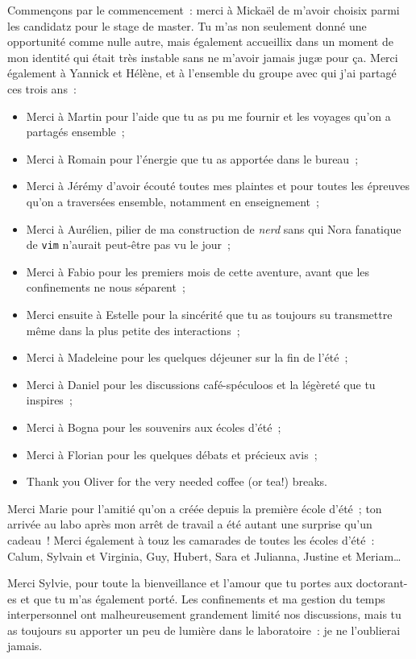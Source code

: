 \documentclass[../main/main.tex]{subfiles}
\begin{document}
Commençons par le commencement~: merci à Mickaël de m'avoir choisix parmi les
candidatz pour le stage de master. Tu m'as non seulement donné une opportunité
comme nulle autre, mais également accueillix dans un moment de mon identité qui
était très instable sans ne m'avoir jamais jugæ pour ça. Merci également à
Yannick et Hélène, et à l'ensemble du groupe avec qui j'ai partagé ces trois
ans~:
\begin{itemize}
    \item Merci à Martin pour l'aide que tu as pu me fournir et les voyages
        qu'on a partagés ensemble~;
    \item Merci à Romain pour l'énergie que tu as apportée dans le bureau~;
    \item Merci à Jérémy d'avoir écouté toutes mes plaintes et pour toutes les
        épreuves qu'on a traversées ensemble, notamment en enseignement~;
    \item Merci à Aurélien, pilier de ma construction de \textit{nerd} sans qui
      Nora fanatique de \texttt{vim} n'aurait peut-être pas vu le jour~;
    \item Merci à Fabio pour les premiers mois de cette aventure, avant que les
        confinements ne nous séparent~;
    \item Merci ensuite à Estelle pour la sincérité que tu as toujours su
        transmettre même dans la plus petite des interactions~;
    \item Merci à Madeleine pour les quelques déjeuner sur la fin de l'été~;
    \item Merci à Daniel pour les discussions café-spéculoos et la légèreté que
        tu inspires~;
    \item Merci à Bogna pour les souvenirs aux écoles d'été~;
    \item Merci à Florian pour les quelques débats et précieux avis~;
    \item Thank you Oliver for the very needed coffee (or tea\string!) breaks.
\end{itemize}

Merci Marie pour l'amitié qu'on a créée depuis la première école d'été~; ton
arrivée au labo après mon arrêt de travail a été autant une surprise qu'un
cadeau~! Merci également à touz les camarades de toutes les écoles d'été~:
Calum, Sylvain et Virginia, Guy, Hubert, Sara et Julianna, Justine et Meriam…

Merci Sylvie, pour toute la bienveillance et l'amour que tu portes aux
doctorant-es et que tu m'as également porté. Les confinements et ma gestion du
temps interpersonnel ont malheureusement grandement limité nos discussions, mais
tu as toujours su apporter un peu de lumière dans le laboratoire~: je ne
l'oublierai jamais.
\end{document}
